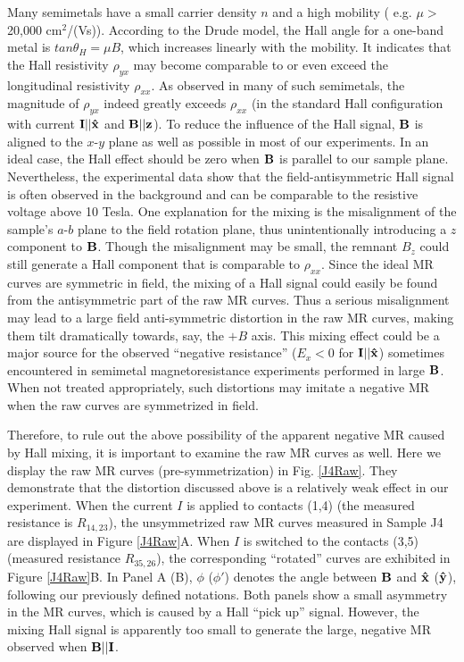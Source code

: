 Many semimetals have a small carrier density $n$ and a high mobility ( e.g. $\mu>$ 20,000 cm$^2$/(Vs)). According to the Drude model, the Hall angle for a one-band metal is $tan \theta_{H} = \mu B$, which increases linearly with the mobility. It indicates that the Hall resistivity $\rho_{yx}$ may become comparable to or even exceed the longitudinal resistivity $\rho_{xx}$. As observed in many of such semimetals, the magnitude of $\rho_{yx}$ indeed greatly exceeds $\rho_{xx}$ (in the standard Hall configuration with current $\bf I||\hat{x}$ and $\bf B||z$). To reduce the influence of the Hall signal, $\bf B$ is aligned to the $x$-$y$ plane as well as possible in most of our experiments. In an ideal case, the Hall effect should be zero when $\bf B$ is parallel to our sample plane. Nevertheless, the experimental data show that  the field-antisymmetric Hall signal is often observed in the background and can be comparable to the resistive voltage above 10 Tesla. One explanation for the mixing is the misalignment of the sample's $a$-$b$ plane to the field rotation plane, thus unintentionally introducing a $z$ component to $\bf B$. Though the misalignment may be small, the remnant $B_z$ could still generate a Hall component that is comparable to $\rho_{xx}$. Since the ideal MR curves are symmetric in field, the mixing of a Hall signal could easily be found from the antisymmetric part of the raw MR curves. Thus a serious misalignment may lead to a large field anti-symmetric distortion in the raw MR curves, making them tilt dramatically towards, say, the $+B$ axis. This mixing effect could be a major source for the observed ``negative resistance'' ($E_{x}<0$ for $\bf I||\hat{x}$) sometimes encountered in semimetal magnetoresistance experiments performed in large $\bf B$. When not treated appropriately, such distortions may imitate a negative MR when the raw curves are symmetrized in field. 

Therefore, to rule out the above possibility of the apparent negative MR caused by Hall mixing, it is important to examine the raw MR curves as well. Here we display the raw MR curves (pre-symmetrization) in Fig. \ref{J4Raw}. They demonstrate that the distortion discussed above is a relatively weak effect in our experiment. When the current $I$ is applied to contacts (1,4) (the measured resistance is $R_{14,23}$), the unsymmetrized raw MR curves measured in Sample J4 are displayed in Figure \ref{J4Raw}A. When $I$ is switched to the contacts (3,5) (measured resistance $R_{35,26}$), the corresponding ``rotated'' curves are exhibited in Figure \ref{J4Raw}B. In Panel A (B), $\phi$ ($\phi'$) denotes the angle between $\bf{B}$ and $\bf\hat{x}$ ($\bf\hat{y}$), following our previously defined notations. Both panels show a small asymmetry in the MR curves, which is caused by a Hall ``pick up'' signal. However, the mixing Hall signal is apparently too small to generate the large, negative MR observed when $\bf B || \bf I$.

